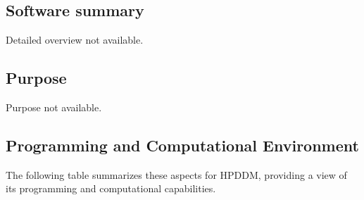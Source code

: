 \subsection{Software summary}
\label{sec:HPDDM:summary}
Detailed overview not available.



\subsection{Purpose}
\label{sec:HPDDM:purpose}
Purpose not available.

\subsection{Programming and Computational Environment}
\label{sec::HPDDM:environment_capabilities}


The following table summarizes these aspects for HPDDM, providing a  view of its programming and computational capabilities.

